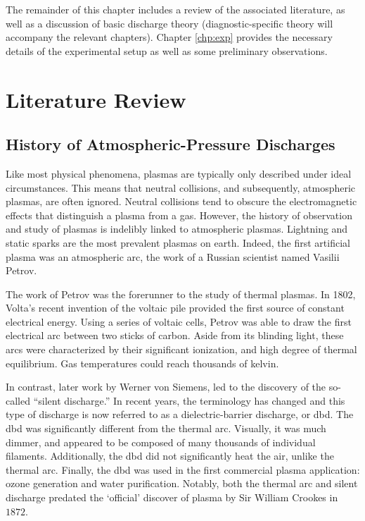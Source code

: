The remainder of this chapter includes a review of the associated literature, as
well as a discussion of basic discharge theory (diagnostic-specific theory will
accompany the relevant chapters). Chapter \ref{chp:exp} provides the necessary
details of the experimental setup as well as some preliminary observations. 

\section{Literature Review}

\subsection{History of Atmospheric-Pressure Discharges}

Like most physical phenomena, plasmas are typically only described under ideal
circumstances. This means that neutral collisions, and subsequently, atmospheric
plasmas, are often ignored. Neutral collisions tend to obscure the
electromagnetic effects that distinguish a plasma from a gas. However, the
history of observation and study of plasmas is indelibly linked to atmospheric
plasmas. Lightning and static sparks are the most prevalent plasmas on earth.
Indeed, the first artificial plasma was an atmospheric arc, the work of a
Russian scientist named Vasilii Petrov.

The work of Petrov was the forerunner to the study of thermal plasmas. In 1802,
Volta's recent invention of the voltaic pile provided the first source of
constant electrical energy. Using a series of voltaic cells, Petrov was able to
draw the first electrical arc between two sticks of carbon. Aside from its
blinding light, these arcs were characterized by their significant ionization,
and high degree of thermal equilibrium. Gas temperatures could reach thousands
of kelvin.

In contrast, later work by Werner von Siemens, led to the discovery of the
so-called ``silent discharge.'' In recent years, the terminology has changed and
this type of discharge is now referred to as a dielectric-barrier discharge, or
\acs{dbd}. The \acs{dbd} was significantly different from the thermal arc.
Visually, it was much dimmer, and appeared to be composed of many thousands of
individual filaments. Additionally, the \acs{dbd} did not significantly heat the
air, unlike the thermal arc. Finally, the \acs{dbd} was used in the first
commercial plasma application: ozone generation and water purification. Notably,
both the thermal arc and silent discharge predated the `official' discover of
plasma by Sir William Crookes in $1872$.


